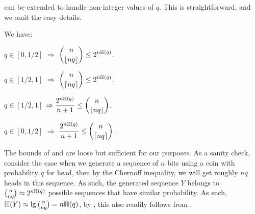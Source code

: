  can be extended to handle non-integer values of
$q$. This is straightforward, and we omit the easy details.
\begin{corollary}
    We have:

    \noindent%
    \begin{minipage}{0.45\linewidth}
        \begin{compactenumi}[series=my_list]
            \item $q \in [0, 1/2]$ $\Rightarrow$
            $\ds\binom{n}{\floor{nq}} \leq 2^{n \Entropy{q}}$.
            
            \smallskip%
            \item $q \in [1/2,1]$ $\Rightarrow$
            $\ds \binom{n}{\ceil{nq}} \leq 2^{n \Entropy{q}}$.
            
        \end{compactenumi}
    \end{minipage}
    \begin{minipage}{0.45\linewidth}
        \begin{compactenumi}[resume*=my_list]
            \item $q \in [1/2,1]$
            $\Rightarrow \ds \frac{2^{n \Entropy{q}}}{n+1} \leq
            \binom{n}{\floor{nq}}$.
            
            \smallskip%
            \item $q \in [0,1/2]$ $\Rightarrow$
            $\ds \frac{2^{n \Entropy{q}}}{n+1} \leq
            \binom{n}{\ceil{nq}}$.
        \end{compactenumi}
    \end{minipage}
\end{corollary}

The bounds of  and  are
loose but sufficient for our purposes. As a sanity check, consider the
case when we generate a sequence of $n$ bits using a coin with
probability $q$ for head, then by the Chernoff inequality, we will get
roughly $nq$ heads in this sequence. As such, the generated sequence
$Y$ belongs to $\binom{n}{nq} \approx 2^{n \Entropy{q}}$ possible
sequences that have similar probability. As such,
$\Entropy{Y} \approx \lg \binom{n}{nq} = n \Entropy{q}$, by
, this also readily follows from
.


